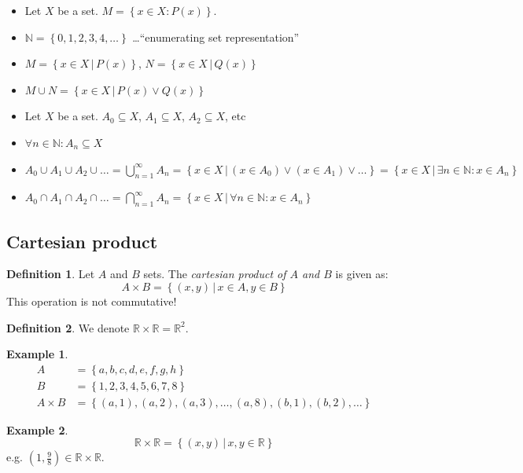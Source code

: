 \documentclass[a4paper,landscape,twocolumn]{article}
\theoremstyle{definition}
\newtheorem{defi}{Definition}
\newtheorem{ex}{Example}
\newcommand\set[1]{\left\{#1\right\}}
\newcommand\setdef[2]{\left\{#1\,|\,#2\right\}}
\begin{document}
\begin{itemize}
  \item Let $X$ be a set. $M = \set{x \in X: P(x)}$.
  \item $\mathbb N = \set{0,1,2,3,4, \dots}$ \dots \enquote{enumerating set representation}
  \item $M = \setdef{x \in X}{P(x)}$, $N = \setdef{x \in X}{Q(x)}$
  \item $M \cup N = \setdef{x \in X}{P(x) \lor Q(x)}$
  \item Let $X$ be a set. $A_0 \subseteq X$, $A_1 \subseteq X$, $A_2 \subseteq X$, etc
  \item $\forall n \in \mathbb N: A_n \subseteq X$
  \item $A_0 \cup A_1 \cup A_2 \cup \dots = \bigcup_{n=1}^\infty A_{n} = \setdef{x \in X}{(x \in A_0) \lor (x \in A_1) \lor \dots} = \setdef{x \in X}{\exists n \in \mathbb N: x \in A_n}$
  \item $A_0 \cap A_1 \cap A_2 \cap \dots = \bigcap_{n=1}^\infty A_n = \setdef{x \in X}{\forall n \in \mathbb N: x \in A_n}$
\end{itemize}

\subsection{Cartesian product}
\begin{defi}
  Let $A$ and $B$ sets. The \emph{cartesian product of $A$ and $B$} is given as:
  \[ A \times B = \setdef{(x, y)}{x \in A, y \in B} \]
  This operation is not commutative!
\end{defi}

\begin{defi}
  We denote $\mathbb R \times \mathbb R = \mathbb R^2$.
\end{defi}

\begin{ex}
  \begin{align*}
    A &= \set{a, b, c, d, e, f, g, h} \\
    B &= \set{1, 2, 3, 4, 5, 6, 7, 8} \\
    A \times B &= \set{(a, 1), (a, 2), (a, 3), \dots, (a, 8), (b, 1), (b, 2), \dots}
  \end{align*}
\end{ex}

\begin{ex}
  \[ \mathbb R \times \mathbb R = \setdef{(x, y)}{x, y \in \mathbb R} \]
  e.g. $(1, \frac98) \in \mathbb R \times \mathbb R$.
\end{ex}
\end{document}

